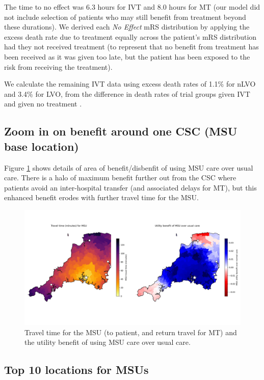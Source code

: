 The time to no effect was 6.3 hours for IVT \cite{emberson_effect_2014} and 8.0 hours for MT \cite{ fransen_time_2016} (our model did not include selection of patients who may still benefit from treatment beyond these durations). We derived each \textit{No Effect} mRS distribution by applying the excess death rate due to treatment equally across the patient’s mRS distribution had they not received treatment (to represent that no benefit from treatment has been received as it was given too late, but the patient has been exposed to the risk from receiving the treatment).

We calculate the remaining IVT data using excess death rates of 1.1\% for nLVO and 3.4\% for LVO, from the difference in death rates of trial groups given IVT and given no treatment \cite{emberson_effect_2014}.

\subsection{Zoom in on benefit around one CSC (MSU base location)}

Figure \ref{fig:map_zoom} shows details of area of benefit/disbenfit of using MSU care over usual care. There is a halo of maximum benefit further out from the CSC where patients avoid an inter-hospital transfer (and associated delays for MT), but this enhanced benefit erodes with further travel time for the MSU.

\begin{figure}[h!]
    \centering
    \includegraphics[width=1.0\linewidth]{images/map_zoom.jpg}
    \caption{Travel time for the MSU (to patient, and return travel for MT) and the utility benefit of using MSU care over usual care.}
    \label{fig:map_zoom}
\end{figure}

\subsection{Top 10 locations for MSUs}

